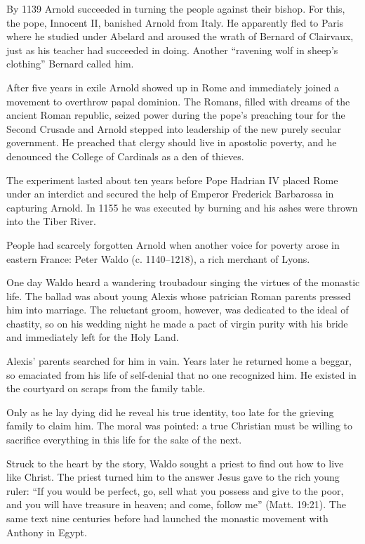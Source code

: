 By 1139 Arnold succeeded in turning the people against their bishop. For this, the pope, Innocent
II, banished Arnold from Italy. He apparently fled to Paris where he studied under Abelard and
aroused the wrath of Bernard of Clairvaux, just as his teacher had succeeded in doing. Another
“ravening wolf in sheep’s clothing” Bernard called him.

After five years in exile Arnold showed up in Rome and immediately joined a movement to overthrow
papal dominion. The Romans, filled with dreams of the ancient Roman republic, seized power during
the pope’s preaching tour for the Second Crusade and Arnold stepped into leadership of the new
purely secular government. He preached that clergy should live in apostolic poverty, and he
denounced the College of Cardinals as a den of thieves.

The experiment lasted about ten years before Pope Hadrian IV placed Rome under an interdict and
secured the help of Emperor Frederick Barbarossa in capturing Arnold. In 1155 he was executed by
burning and his ashes were thrown into the Tiber River.

People had scarcely forgotten Arnold when another voice for poverty arose in eastern France: Peter
Waldo (c. 1140–1218), a rich merchant of Lyons.

One day Waldo heard a wandering troubadour singing the virtues of the monastic life. The ballad was
about young Alexis whose patrician Roman parents pressed him into marriage. The reluctant groom,
however, was dedicated to the ideal of chastity, so on his wedding night he made a pact of virgin
purity with his bride and immediately left for the Holy Land.

Alexis’ parents searched for him in vain. Years later he returned home a beggar, so emaciated from
his life of self-denial that no one recognized him. He existed in the courtyard on scraps from the
family table.

Only as he lay dying did he reveal his true identity, too late for the grieving family to claim him.
The moral was pointed: a true Christian must be willing to sacrifice everything in this life for the
sake of the next.

Struck to the heart by the story, Waldo sought a priest to find out how to live like Christ. The
priest turned him to the answer Jesus gave to the rich young ruler: “If you would be perfect, go,
sell what you possess and give to the poor, and you will have treasure in heaven; and come, follow
me” (Matt. 19:21). The same text nine centuries before had launched the monastic movement with
Anthony in Egypt.

